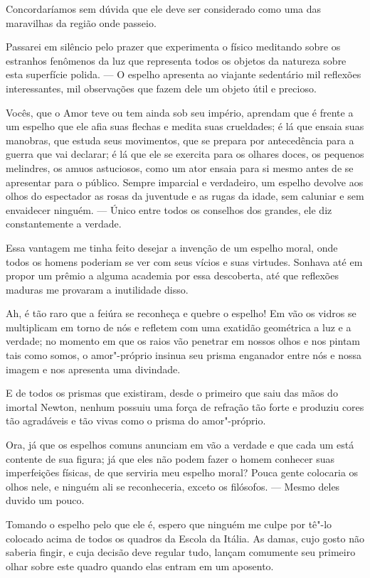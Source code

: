  Concordaríamos sem dúvida que ele deve ser considerado como uma das
maravilhas da região onde passeio.

 Passarei em silêncio pelo prazer que experimenta o físico meditando
sobre os estranhos fenômenos da luz que representa todos os objetos da
natureza sobre esta superfície polida. --- O espelho apresenta ao
viajante sedentário mil reflexões interessantes, mil observações que
fazem dele um objeto útil e precioso.

 Vocês, que o Amor teve ou tem ainda sob seu império, aprendam que é
frente a um espelho que ele afia suas flechas e medita suas crueldades;
é lá que ensaia suas manobras, que estuda seus movimentos, que se
prepara por antecedência para a guerra que vai declarar; é lá que ele
se exercita para os olhares doces, os pequenos melindres, os amuos
astuciosos, como um ator ensaia para si mesmo antes de se apresentar
para o público. Sempre imparcial e verdadeiro, um espelho devolve aos
olhos do espectador as rosas da juventude e as rugas da idade, sem
caluniar e sem envaidecer ninguém. --- Único entre todos os conselhos
dos grandes, ele diz constantemente a verdade.

Essa vantagem me tinha feito desejar a invenção de um espelho moral,
onde todos os homens poderiam se ver com seus vícios e suas virtudes.
Sonhava até em propor um prêmio a alguma academia por essa descoberta,
até que reflexões maduras me provaram a inutilidade disso.

Ah, é tão raro que a feiúra se reconheça e quebre o espelho! Em vão os
vidros se multiplicam em torno de nós e refletem com uma exatidão
geométrica a luz e a verdade; no momento em que os raios vão penetrar
em nossos olhos e nos pintam tais como somos, o amor"-próprio insinua
seu prisma enganador entre nós e nossa imagem e nos apresenta uma
divindade.

E de todos os prismas que existiram, desde o primeiro que saiu das mãos
do imortal Newton, nenhum possuiu uma força de refração tão forte e
produziu cores tão agradáveis e tão vivas como o prisma do
amor"-próprio.

Ora, já que os espelhos comuns anunciam em vão a verdade e que cada um
está contente de sua figura; já que eles não podem fazer o homem
conhecer suas imperfeições físicas, de que serviria meu espelho moral?
Pouca gente colocaria os olhos nele, e ninguém ali se reconheceria,
exceto os filósofos. --- Mesmo deles duvido um pouco.

Tomando o espelho pelo que ele é, espero que ninguém me culpe por tê"-lo
colocado acima de todos os quadros da Escola da Itália. As damas, cujo
gosto não saberia fingir, e cuja decisão deve regular tudo, lançam
comumente seu primeiro olhar sobre este quadro quando elas entram em um
aposento. 

